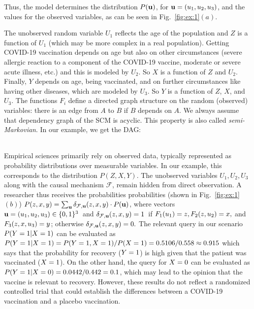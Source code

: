 \documentclass[a4paper,UKenglish,cleveref, autoref, thm-restate]{lipics-v2021}
\newcommand{\compactEquals}[1]{\let\IsInPP=1#1\let\IsInPP=\relax}
\newcommand{\pp}[1]{{P}(\compactEquals{#1})}
\newcommand{\cF}{{\mathcal F}}
\newcommand{\bu}{{\bf u}}
\def\mmid{ | }
\begin{document}
Thus, the model determines the distribution 
$P(\bu)$, for $\bu=(u_1,u_2,u_3)$, 
and the values for the observed variables, 
as can be seen in Fig.~\ref{fig:ex:1}$(a)$. 


The unobserved random variable $U_1$ reflects the age of the population  and $Z$ is a function of $U_1$ (which may be more complex in a real population).
Getting COVID-19 vaccination depends on age but also on other circumstances (severe allergic reaction to a component of the COVID-19 vaccine, moderate or severe acute illness, etc.) and this is modeled by 
$U_2$. So $X$ is a function of $Z$ and $U_2$.
Finally, $Y$ depends on age, being vaccinated, and
on further circumstances like having other diseases, which are modeled by $U_3$. So $Y$ is a function of $Z$, $X$, and $U_3$. The functions $F_i$ define a directed graph structure on the random (observed) variables: there is an edge from $A$ to $B$ if $B$ depends on $A$. We always assume that
dependency graph of the SCM is acyclic. This property is also called \emph{semi-Markovian}.
In our example, we get the DAG:
\\


 

 Empirical sciences primarily rely on observed data, typically represented as probability distributions over measurable variables. In our example, this corresponds to the distribution 
$P(Z,X,Y)$. The unobserved variables $U_1,U_2,U_3$ along with the causal mechanism $\cF$, remain hidden from direct observation. A researcher thus receives the probabilities probabilities (shown in Fig.~\ref{fig:ex:1}$(b)$)
 $P(z,x,y)=\sum_{\bu}\delta_{\cF,\bu}(z,x,y)\cdot P(\bu)$, where vectors
 $\bu=(u_1,u_2,u_3)\in \{0,1\}^3$~and
 $\delta_{\cF,\bu}(z,x,y)=1$~if $\compactEquals{F_1(u_1)=z, F_2(z,u_2)=x,}$ 
 and 
 $\compactEquals{F_3(z,x,u_3)=y}$; otherwise
 $\delta_{\cF,\bu}(z,x,y)=0.$
The relevant query in our scenario $\pp{Y=1\mmid X=1}$ can be evaluated as
$\pp{Y=1\mmid X=1}=\pp{Y=1,X=1}/\pp{X=1}=0.5106/0.558\approx 0.915$  which says 
that the probability for recovery ($\compactEquals{Y=1}$) is high
given that the patient was vaccinated ($\compactEquals{X=1}$).
On the other hand, the query for $\compactEquals{X=0}$ can be evaluated as
$\pp{Y=1\mmid X=0}=0.0442/0.442=0.1$, which
may lead to the opinion that the vaccine is relevant to recovery. However, these results do not reflect a randomized controlled trial \cite{fisher1936design} that could establish the differences between a COVID-19 vaccination and a placebo vaccination.\\
\end{document}
